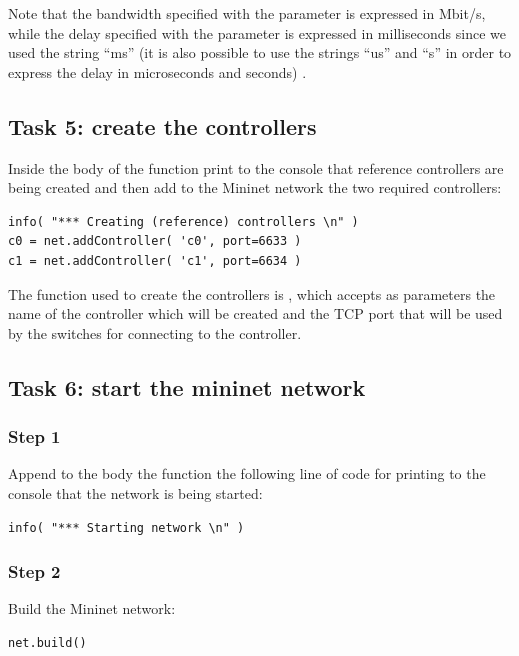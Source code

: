 Note that the bandwidth specified with the parameter  is expressed in
Mbit/s, while the delay specified with the parameter  is expressed
in milliseconds since we used the string ``ms'' (it is also possible to use
the strings ``us'' and ``s'' in order to express the delay in microseconds and
seconds) \cite{ref-7}.





\subsection*{Task 5: create the controllers}
Inside the body of the function  print to the console
that reference controllers are being created and then add to the Mininet network
the two required controllers:
\begin{lstlisting}
info( "*** Creating (reference) controllers \n" )
c0 = net.addController( 'c0', port=6633 )
c1 = net.addController( 'c1', port=6634 )
\end{lstlisting}

The function used to create the controllers is , which accepts
as parameters the name of the controller which will be created and the TCP port that
will be used by the switches for connecting to the controller.







\subsection*{Task 6: start the mininet network}
\subsubsection*{Step 1}
Append to the body the function  the following line
of code for printing to the console that the network is being started:
\begin{lstlisting}
info( "*** Starting network \n" )
\end{lstlisting}

\subsubsection*{Step 2}
Build the Mininet network:
\begin{lstlisting}
net.build()
\end{lstlisting}


